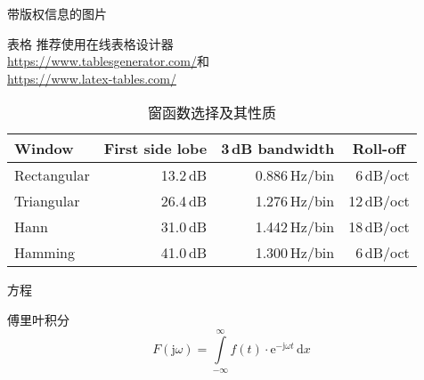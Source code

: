 \documentclass[newPxFont,sthlmFooter]{beamer}
\begin{document}
\begin{frame}{带版权信息的图片}
	\begin{figure}
		\centering
	\end{figure}
\end{frame}


\begin{frame}{表格}
	推荐使用在线表格设计器\\\url{https://www.tablesgenerator.com/}和\\\url{https://www.latex-tables.com/}
\begin{table}[]
	\caption{ 窗函数选择及其性质 }
	\begin{tabular}[]{lrrr}
		\toprule
		\textbf{Window}			& \multicolumn{1}{c}{\textbf{First side lobe}}
		                    & \multicolumn{1}{c}{\textbf{3\,dB bandwidth}}
		                    & \multicolumn{1}{c}{\textbf{Roll-off}} \\
		\midrule
		Rectangular				& 13.2\,dB	& 0.886\,Hz/bin	& 6\,dB/oct		\\[0.25em]
		Triangular				& 26.4\,dB	& 1.276\,Hz/bin	& 12\,dB/oct	\\[0.25em]
		Hann					& 31.0\,dB	& 1.442\,Hz/bin	& 18\,dB/oct	\\[0.25em]
		Hamming					& 41.0\,dB	& 1.300\,Hz/bin	& 6\,dB/oct		\\
		\bottomrule
	\end{tabular}
	\label{tab:WindowFunctions}
\end{table}
\end{frame}


\begin{frame}{方程}
\begin{block}{傅里叶积分}
\[
F(\textrm{j}\omega) = \displaystyle \int \limits_{-\infty}^{\infty} \! f(t)\cdot\textrm{e}^{-\textrm{j}\omega t}  \, \mathrm{d} x
\]
\end{block}
\end{frame}

\end{document}
